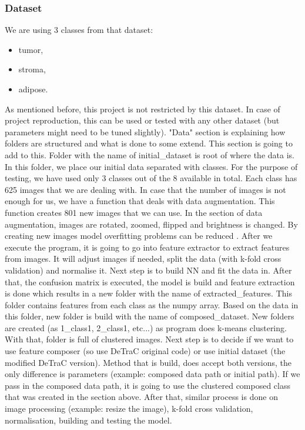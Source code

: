 \subsubsection{Dataset}
We are using 3 classes from that dataset:
\begin{itemize}
  \item tumor,
  \item stroma,
  \item adipose.
\end{itemize}

As mentioned before, this project is not restricted by this dataset. In case of project reproduction, this can be used or tested with any other dataset (but parameters might need to be tuned slightly).
\newline
"Data" section is explaining how folders are structured and what is done to some extend. This section is going to add to this.
Folder with the name of initial{\_}dataset is root of where the data is. In this folder, we place our initial data separated with classes. 
\newline
For the purpose of testing, we have used only 3 classes out of the 8 available in total. Each class has 625 images that we are dealing with. In case that the number of images is not enough for us, we have a function that deals with data augmentation. This function creates 801 new images that we can use. In the section of data augmentation, images are rotated, zoomed, flipped and brightness is changed. By creating new images model overfitting problems can be reduced \parencite{bloice2017augmentor}.
\newline
After we execute the program, it is going to go into feature extractor to extract features from images. It will adjust images if needed, split the data (with k-fold cross validation) and normalise it. Next step is to build NN and fit the data in. After that, the confusion matrix is executed, the model is build and feature extraction is done which results in a new folder with the name of extracted{\_}features. This folder contains features from each class as the numpy array. Based on the data in this folder, new folder is build with the name of composed{\_}dataset. New folders are created (as 1{\_}class1, 2{\_}class1, etc...) as program does k-means clustering. With that, folder is full of clustered images.
\newline
Next step is to decide if we want to use feature composer (so use DeTraC original code) or use initial dataset (the modified DeTraC version). Method that is build, does accept both versions, the only difference is parameters (example: composed data path or initial path). If we pass in the composed data path, it is going to use the clustered composed class that was created in the section above. After that, similar process is done on image processing (example: resize the image), k-fold cross validation, normalisation, building and testing the model.
